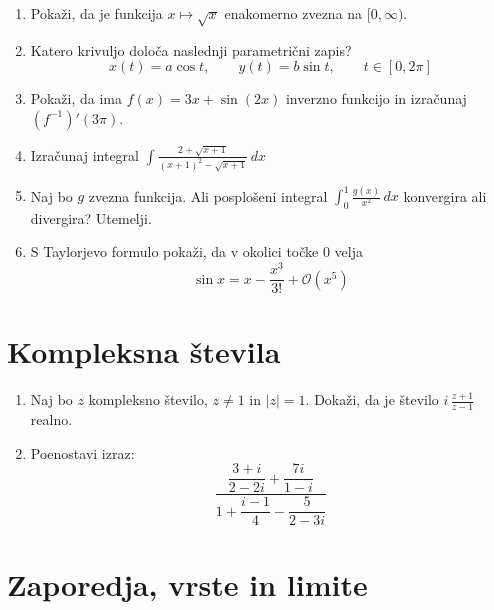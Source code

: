 \documentclass[a4paper,12pt]{article}
\begin{document}
\begin{enumerate}
\item
Pokaži, da je funkcija \(x \mapsto \sqrt{x}\) enakomerno zvezna na \([0, \infty)\).

\item
Katero krivuljo določa naslednji parametrični zapis?
\[
x(t) = a \cos t, \qquad %
y(t) = b \sin t, \qquad %
t \in [0, 2 \pi]
\]

\item
Pokaži, da ima \(f(x)= 3x + \sin (2x)\) inverzno funkcijo in izračunaj \((f^{-1})'(3\pi)\).

\item
Izračunaj integral
\(\displaystyle \int \frac{2+\sqrt{x+1}}{(x+1)^2-\sqrt{x+1}} \,dx\)


\item
Naj bo \(g\) zvezna funkcija. Ali posplošeni integral \(\int ^1 _ 0\frac{g(x)}{x^2} \, dx\)
konvergira ali divergira? Utemelji.

\item
S Taylorjevo formulo pokaži, da v okolici točke \(0\) velja
\[\sin x=x- \frac{x^3}{3!}+ \mathcal{O}(x^5)\]
\end{enumerate}

\section*{Kompleksna števila}

\begin{enumerate}
\item
Naj bo \(z\) kompleksno število, \(z \ne 1\) in \(|z|=1\).
Dokaži, da je število \( i \, \frac{z+1}{z-1} \) realno.

\item
Poenostavi izraz:
\[ \dfrac{\dfrac{3+i}{2-2i} + \dfrac{7i}{1-i}}{1 + \dfrac{i-1}{4} - \dfrac{5}{2-3i}} \]
\end{enumerate}

\section*{Zaporedja, vrste in limite}
\end{document}
